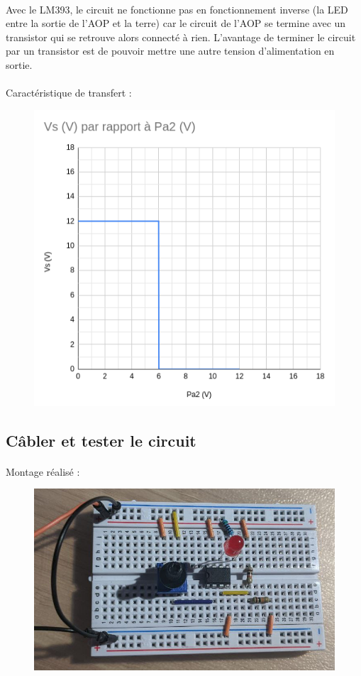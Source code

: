 \documentclass{article}
\begin{document}
\paragraph{}
Avec le LM393, le circuit ne fonctionne pas en fonctionnement inverse (la LED entre la sortie de l'AOP et la terre) car le circuit de l'AOP se termine avec un transistor qui se retrouve alors connecté à rien. L'avantage de terminer le circuit par un transistor est de pouvoir mettre une autre tension d'alimentation en sortie.

\paragraph{}Caractéristique de transfert :
\begin{figure}[H]
    \centering
    \includegraphics[width=.6\linewidth]{images/labo3-caract-transfert.png}
\end{figure}

\newpage
\subsection{Câbler et tester le circuit}
\paragraph{}Montage réalisé :
\begin{figure}[H]
    \centering
    \includegraphics[width=.8\linewidth]{./images/labo3-montage.jpg}
\end{figure}
\end{document}
